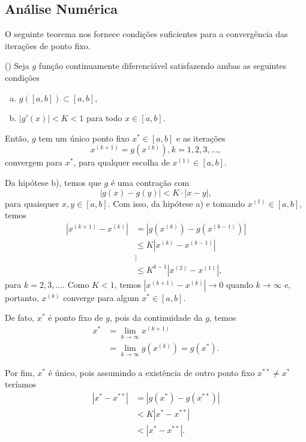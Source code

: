 \subsection{Análise Numérica}

O seguinte teorema nos fornece condições suficientes para a convergência das iterações de ponto fixo.

\begin{teo}()\label{cap_eq1d_sec_pfixo:teo:pfixo}
  Seja $g$ função continuamente diferenciável satisfazendo ambas as seguintes condições
  \begin{enumerate}[a)]
  \item $g\left([a, b]\right) \subset [a, b]$,
  \item $|g'(x)|<K<1$ para todo $x\in [a, b]$.
  \end{enumerate}
  Então, $g$ tem um único ponto fixo $x^*\in [a, b]$ e as iterações
  \begin{equation}
    x^{(k+1)}= g\left(x^{(k)}\right), k=1, 2, 3, \ldots,
  \end{equation}
  convergem para $x^*$, para qualquer escolha de $x^{(1)}\in [a, b]$.
\end{teo}
\begin{dem}
  Da hipótese b), temos que $g$ é uma contração com
  \begin{equation}
    \left|g(x) - g(y)\right| < K\cdot |x - y|,
  \end{equation}
  para quaisquer $x,y\in [a, b]$. Com isso, da hipótese a) e tomando $x^{(1)}\in [a, b]$, temos
  \begin{align}
    \left|x^{(k+1)} - x^{(k)}\right| &= \left|g(x^{(k)}) - g(x^{(k-1)})\right|\\
                                     &\leq K \left|x^{(k)} - x^{(k-1)}\right|\\
                                     &\vdots \nonumber\\
                                     &\leq K^{k-1}\left|x^{(2)}-x^{(1)}\right|,
  \end{align}
  para $k=2, 3, \ldots$. Como $K<1$, temos $\left|x^{(k+1)}-x^{(k)}\right|\to 0$ quando $k\to\infty$ e, portanto, $x^{(k)}$ converge para algum $x^*\in [a, b]$.
  
  De fato, $x^*$ é ponto fixo de $g$, pois da continuidade da $g$, temos
  \begin{align}
    x^* &= \lim_{k\to\infty} x^{(k+1)}\\
        &= \lim_{k\to\infty} g(x^{(k)}) = g(x^*).
  \end{align}
  
  Por fim, $x^*$ é único, pois assumindo a existência de outro ponto fixo $x^{**}\neq x^*$ teríamos
  \begin{align}
    |x^* - x^{**}| &= |g(x^*) - g(x^{**})| \\
                   &< K|x^* - x^{**}|\\
                   &< |x^* - x^{**}|.
  \end{align}
\end{dem}


